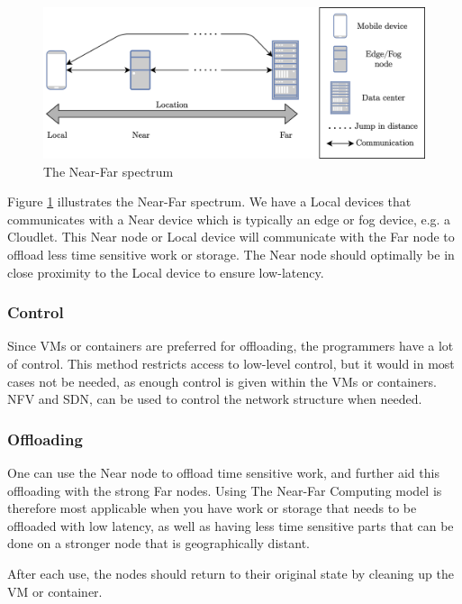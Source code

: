 \begin{figure}[t]
    \centering
    \includegraphics[scale=1]{chapters/6_evaluation/figures/near-far_diagram.png}
    \caption{The Near-Far spectrum}
    \label{fig:nearFarSimple}
\end{figure}


Figure \ref{fig:nearFarSimple} illustrates the Near-Far spectrum. We have a Local devices that communicates with a Near device which is typically an edge or fog device, e.g. a Cloudlet. This Near node or Local device will communicate with the Far node to offload less time sensitive work or storage. The Near node should optimally be in close proximity to the Local device to ensure low-latency.

\subsubsection{Control}
Since VMs or containers are preferred for offloading, the programmers have a lot of control. This method restricts access to low-level control, but it would in most cases not be needed, as enough control is given within the VMs or containers. NFV and SDN, can be used to control the network structure when needed.

\subsubsection{Offloading}
One can use the Near node to offload time sensitive work, and further aid this offloading with the strong Far nodes. Using The Near-Far Computing model is therefore most applicable when you have work or storage that needs to be offloaded with low latency, as well as having less time sensitive parts that can be done on a stronger node that is geographically distant. 

After each use, the nodes should return to their original state by cleaning up the VM or container.


